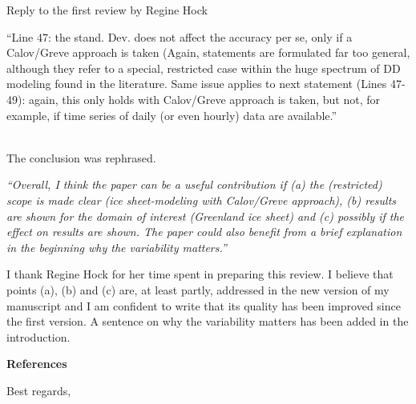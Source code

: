 \documentclass{letter}
\newcommand{\rev}[0]{\color{blue!50!black}\it}
\newcommand{\textrev}[1]{{\rev``#1''}}
\newcommand{\revpoint}[1]{{\rev\item``#1''}\\}
\begin{document}
\begin{letter}{Reply to the first review by Regine Hock}
\begin{enumerate}[resume]
    \revpoint{Line 47: the stand. Dev. does not affect the accuracy per se, only if a Calov/Greve approach is taken (Again, statements are formulated far too general, although they refer to a special, restricted case within the huge spectrum of DD modeling found in the literature. Same issue applies to next statement (Lines 47- 49): again, this only holds with Calov/Greve approach is taken, but not, for example, if time series of daily (or even hourly) data are available.}

    The conclusion was rephrased.

\end{enumerate}


\textrev{Overall, I think the paper can be a useful contribution if (a) the (restricted) scope is made clear (ice sheet-modeling with Calov/Greve approach), (b) results are shown for the domain of interest (Greenland ice sheet) and (c) possibly if the effect on results are shown. The paper could also benefit from a brief explanation in the beginning why the variability matters.}

I thank Regine Hock for her time spent in preparing this review. I believe that points (a), (b) and (c) are, at least partly, addressed in the new version of my manuscript and I am confident to write that its quality has been improved since the first version. A sentence on why the variability matters has been added in the introduction.

\textbf{References}



\closing{Best regards,}

\end{letter}
\end{document}
